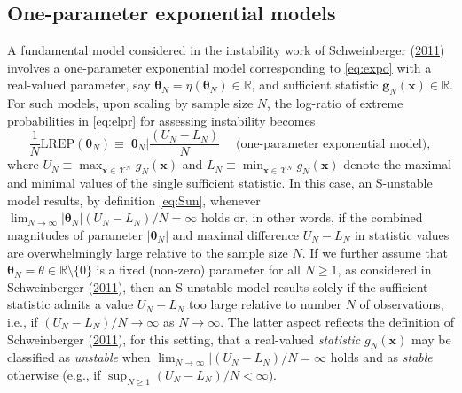\documentclass[]{article}
\theoremstyle{definition}
\newcommand{\REP}{\mathrm{LREP}}
\begin{document}
\subsection{One-parameter exponential models}\label{one-param-exp}

A fundamental model considered in the instability work of Schweinberger
(\protect\hyperlink{ref-schweinberger2011instability}{2011}) involves a
one-parameter exponential model corresponding to \eqref{eq:expo} with a
real-valued parameter, say
\(\boldsymbol \theta_N = \eta(\boldsymbol \theta_N)\in \mathbb{R}\), and
sufficient statistic \(\boldsymbol g_N(\boldsymbol x)\in \mathbb{R}\).
For such models, upon scaling by sample size \(N\), the log-ratio of
extreme probabilities in \eqref{eq:elpr} for assessing instability becomes
\begin{equation}
\label{eq:UL}
\frac{1}{N}\REP(\boldsymbol \theta_N ) \equiv   |\boldsymbol \theta_N| \frac{(U_N-L_N)}{N} \;\quad \mbox{(one-parameter exponential model)},
\end{equation}
where
\(U_N \equiv \max_{\boldsymbol x\in\mathcal{X}^N}g_N(\boldsymbol x)\)
and
\(L_N \equiv \min_{\boldsymbol x\in\mathcal{X}^N}g_N(\boldsymbol x)\)
denote the maximal and minimal values of the single sufficient
statistic. In this case, an S-unstable model results, by definition
\eqref{eq:Sun}, whenever
\(\lim_{N\to \infty} |\boldsymbol \theta_N| (U_N-L_N)/N= \infty\) holds
or, in other words, if the combined magnitudes of parameter
\(|\boldsymbol \theta_N|\) and maximal difference \(U_N-L_N\) in
statistic values are overwhelmingly large relative to the sample size
\(N\). If we further assume that
\(\boldsymbol \theta_N =\theta\in\mathbb{R}\setminus \{0\}\) is a fixed
(non-zero) parameter for all \(N \geq 1\), as considered in
Schweinberger
(\protect\hyperlink{ref-schweinberger2011instability}{2011}), then an
S-unstable model results solely if the sufficient statistic admits a
value \(U_N-L_N\) too large relative to number \(N\) of observations,
i.e., if \((U_N-L_N)/N\to \infty\) as \(N\to \infty\). The latter aspect
reflects the definition of Schweinberger
(\protect\hyperlink{ref-schweinberger2011instability}{2011}), for this
setting, that a real-valued \emph{statistic} \(g_N(\boldsymbol x)\) may
be classified as \emph{unstable} when
\(\lim_{N\to \infty}|(U_N-L_N)/N=\infty\) holds and as \emph{stable}
otherwise (e.g., if \(\sup_{N \geq 1}(U_N-L_N)/N<\infty\)).
\end{document}
